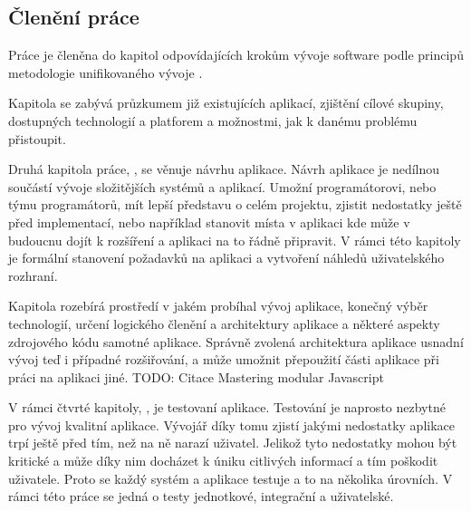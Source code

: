 \begin{introduction}
    \section{Členění práce}
    Práce je členěna do kapitol odpovídajících krokům vývoje software podle principů metodologie unifikovaného vývoje \cite[s.~51‑68]{arlow_2007_uml}.

    Kapitola  se zabývá průzkumem již existujících aplikací, zjištění cílové skupiny, dostupných technologií a platforem a možnostmi, jak k danému problému přistoupit.

    Druhá kapitola práce, , se věnuje návrhu aplikace. Návrh aplikace je nedílnou součástí vývoje složitějších systémů a aplikací. Umožní programátorovi, nebo týmu programátorů, mít lepší představu o celém projektu, zjistit nedostatky ještě před implementací, nebo například stanovit místa v aplikaci kde může v budoucnu dojít k rozšíření a aplikaci na to řádně připravit. V rámci této kapitoly je formální stanovení požadavků na aplikaci a vytvoření náhledů uživatelského rozhraní.

    Kapitola  rozebírá prostředí v jakém probíhal vývoj aplikace, konečný výběr technologií, určení logického členění a architektury aplikace a některé aspekty zdrojového kódu samotné aplikace. Správně zvolená architektura aplikace usnadní vývoj teď i případné rozšiřování, a může umožnit přepoužití části aplikace při práci na aplikaci jiné. TODO: Citace Mastering modular Javascript

    V rámci čtvrté kapitoly, , je testovaní aplikace. Testování je naprosto nezbytné pro vývoj kvalitní aplikace. Vývojář díky tomu zjistí jakými nedostatky aplikace trpí ještě před tím, než na ně narazí uživatel. Jelikož tyto nedostatky mohou být kritické a může díky nim docházet k úniku citlivých informací a tím poškodit uživatele. Proto se každý systém a aplikace testuje a to na několika úrovních. V rámci této práce se jedná o testy jednotkové, integrační a uživatelské.
\end{introduction}